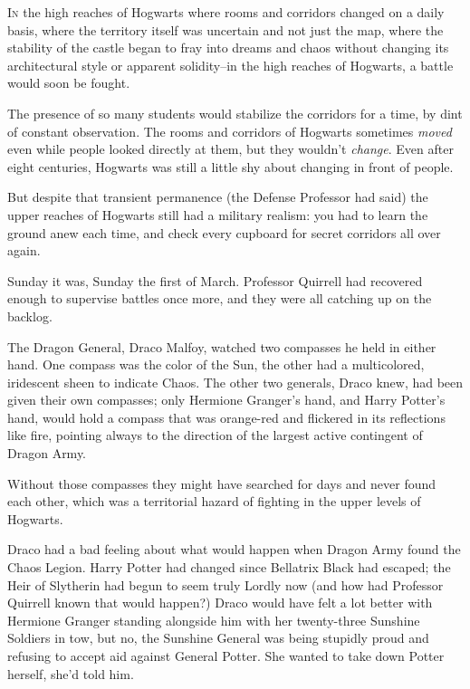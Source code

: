 
\lettrine{I}{n} the high reaches of Hogwarts where rooms and corridors changed on a daily basis, where the territory itself was uncertain and not just the map, where the stability of the castle began to fray into dreams and chaos without changing its architectural style or apparent solidity\---in the high reaches of Hogwarts, a battle would soon be fought.

The presence of so many students would stabilize the corridors for a time, by dint of constant observation. The rooms and corridors of Hogwarts sometimes \emph{moved} even while people looked directly at them, but they wouldn't \emph{change}. Even after eight centuries, Hogwarts was still a little shy about changing in front of people.

But despite that transient permanence (the Defense Professor had said) the upper reaches of Hogwarts still had a military realism: you had to learn the ground anew each time, and check every cupboard for secret corridors all over again.

Sunday it was, Sunday the first of March. Professor Quirrell had recovered enough to supervise battles once more, and they were all catching up on the backlog.

The Dragon General, Draco Malfoy, watched two compasses he held in either hand. One compass was the color of the Sun, the other had a multicolored, iridescent sheen to indicate Chaos. The other two generals, Draco knew, had been given their own compasses; only Hermione Granger's hand, and Harry Potter's hand, would hold a compass that was orange-red and flickered in its reflections like fire, pointing always to the direction of the largest active contingent of Dragon Army.

Without those compasses they might have searched for days and never found each other, which was a territorial hazard of fighting in the upper levels of Hogwarts.

Draco had a bad feeling about what would happen when Dragon Army found the Chaos Legion. Harry Potter had changed since Bellatrix Black had escaped; the Heir of Slytherin had begun to seem truly Lordly now (and how had Professor Quirrell known that would happen?) Draco would have felt a lot better with Hermione Granger standing alongside him with her twenty-three Sunshine Soldiers in tow, but no, the Sunshine General was being stupidly proud and refusing to accept aid against General Potter. She wanted to take down Potter herself, she'd told him.

